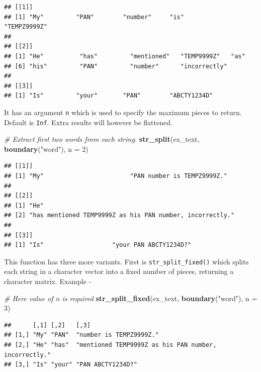 \documentclass[
]{book}
\newenvironment{Shaded}{\begin{snugshade}}{\end{snugshade}}
\newcommand{\AttributeTok}[1]{\textcolor[rgb]{0.13,0.29,0.53}{#1}}
\newcommand{\CommentTok}[1]{\textcolor[rgb]{0.56,0.35,0.01}{\textit{#1}}}
\newcommand{\DecValTok}[1]{\textcolor[rgb]{0.00,0.00,0.81}{#1}}
\newcommand{\FunctionTok}[1]{\textcolor[rgb]{0.13,0.29,0.53}{\textbf{#1}}}
\newcommand{\NormalTok}[1]{#1}
\newcommand{\StringTok}[1]{\textcolor[rgb]{0.31,0.60,0.02}{#1}}
\begin{document}
\begin{verbatim}
## [[1]]
## [1] "My"         "PAN"        "number"     "is"         "TEMPZ9999Z"
## 
## [[2]]
## [1] "He"          "has"         "mentioned"   "TEMP9999Z"   "as"         
## [6] "his"         "PAN"         "number"      "incorrectly"
## 
## [[3]]
## [1] "Is"         "your"       "PAN"        "ABCTY1234D"
\end{verbatim}

It has an argument \texttt{n} which is used to specify the maximum pieces to return. Default is \texttt{Inf}. Extra results will however be flattened.

\begin{Shaded}
\begin{Highlighting}[]
\CommentTok{\# Extract first two words from each string.}
\FunctionTok{str\_split}\NormalTok{(ex\_text, }\FunctionTok{boundary}\NormalTok{(}\StringTok{"word"}\NormalTok{), }\AttributeTok{n =} \DecValTok{2}\NormalTok{)}
\end{Highlighting}
\end{Shaded}

\begin{verbatim}
## [[1]]
## [1] "My"                        "PAN number is TEMPZ9999Z."
## 
## [[2]]
## [1] "He"                                                     
## [2] "has mentioned TEMP9999Z as his PAN number, incorrectly."
## 
## [[3]]
## [1] "Is"                   "your PAN ABCTY1234D?"
\end{verbatim}

This function has three more variants. First is \texttt{str\_split\_fixed()} which splits each string in a character vector into a fixed number of pieces, returning a character matrix. Example -

\begin{Shaded}
\begin{Highlighting}[]
\CommentTok{\# Here value of \textasciigrave{}n\textasciigrave{} is required}
\FunctionTok{str\_split\_fixed}\NormalTok{(ex\_text, }\FunctionTok{boundary}\NormalTok{(}\StringTok{"word"}\NormalTok{), }\AttributeTok{n =} \DecValTok{3}\NormalTok{)}
\end{Highlighting}
\end{Shaded}

\begin{verbatim}
##      [,1] [,2]   [,3]                                                 
## [1,] "My" "PAN"  "number is TEMPZ9999Z."                              
## [2,] "He" "has"  "mentioned TEMP9999Z as his PAN number, incorrectly."
## [3,] "Is" "your" "PAN ABCTY1234D?"
\end{verbatim}
\end{document}
